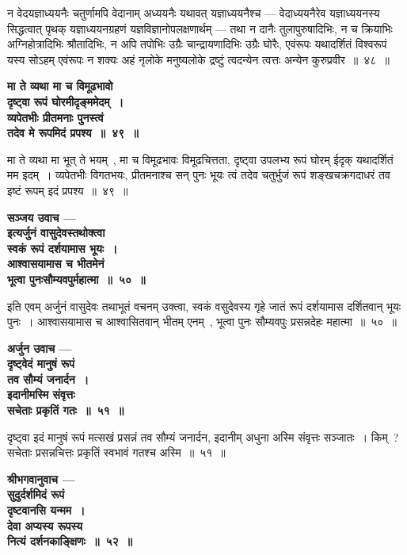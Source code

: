न वेदयज्ञाध्ययनैः चतुर्णामपि वेदानाम् अध्ययनैः यथावत् यज्ञाध्ययनैश्च — वेदाध्ययनैरेव यज्ञाध्ययनस्य सिद्धत्वात् पृथक् यज्ञाध्ययनग्रहणं यज्ञविज्ञानोपलक्षणार्थम् — तथा न दानैः तुलापुरुषादिभिः, न च क्रियाभिः अग्निहोत्रादिभिः श्रौतादिभिः, न अपि तपोभिः उग्रैः चान्द्रायणादिभिः उग्रैः घोरैः, एवंरूपः यथादर्शितं विश्वरूपं यस्य सोऽहम् एवंरूपः न शक्यः अहं नृलोके मनुष्यलोके द्रष्टुं त्वदन्येन त्वत्तः अन्येन कुरुप्रवीर~॥~४८~॥\par
 \begin{center}{\bfseries मा ते व्यथा मा च विमूढभावो\\ दृष्ट्वा रूपं घोरमीदृङ्ममेदम्~।\\व्यपेतभीः प्रीतमनाः पुनस्त्वं\\ तदेव मे रूपमिदं प्रपश्य~॥~४९~॥}\end{center} 
मा ते व्यथा मा भूत् ते भयम्~, मा च विमूढभावः विमूढचित्तता, दृष्ट्वा उपलभ्य रूपं घोरम् ईदृक् यथादर्शितं मम इदम्~। व्यपेतभीः विगतभयः, प्रीतमनाश्च सन् पुनः भूयः त्वं तदेव चतुर्भुजं रूपं शङ्खचक्रगदाधरं तव इष्टं रूपम् इदं प्रपश्य~॥~४९~॥\par
\begin{center}{\bfseries सञ्जय उवाच —\\ इत्यर्जुनं वासुदेवस्तथोक्त्वा\\ स्वकं रूपं दर्शयामास भूयः~।\\आश्वासयामास च भीतमेनं\\ भूत्वा पुनःसौम्यवपुर्महात्मा~॥~५०~॥}\end{center} 
इति एवम् अर्जुनं वासुदेवः तथाभूतं वचनम् उक्त्वा, स्वकं वसुदेवस्य गृहे जातं रूपं दर्शयामास दर्शितवान् भूयः पुनः~। आश्वासयामास च आश्वासितवान् भीतम् एनम्~, भूत्वा पुनः सौम्यवपुः प्रसन्नदेहः महात्मा~॥~५०~॥\par
\begin{center}{\bfseries अर्जुन उवाच —\\ दृष्ट्वेदं मानुषं रूपं\\ तव सौम्यं जनार्दन~।\\इदानीमस्मि संवृत्तः\\ सचेताः प्रकृतिं गतः~॥~५१~॥}\end{center} 
दृष्ट्वा इदं मानुषं रूपं मत्सखं प्रसन्नं तव सौम्यं जनार्दन, इदानीम् अधुना अस्मि संवृत्तः सञ्जातः~। किम्~? सचेताः प्रसन्नचित्तः प्रकृतिं स्वभावं गतश्च अस्मि~॥~५१~॥\par
\begin{center}{\bfseries श्रीभगवानुवाच —\\ सुदुर्दर्शमिदं रूपं\\ दृष्टवानसि यन्मम~।\\देवा अप्यस्य रूपस्य\\ नित्यं दर्शनकाङ्क्षिणः~॥~५२~॥}\end{center} 
